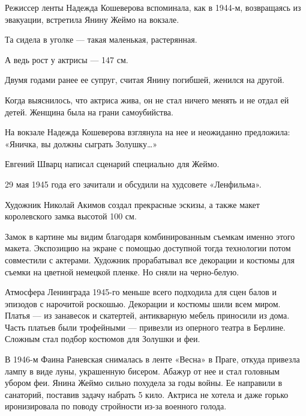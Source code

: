  
 
 


Режиссер ленты Надежда Кошеверова вспоминала, как в 1944-м, возвращаясь из эвакуации, встретила Янину Жеймо на вокзале.

Та сидела в уголке — такая маленькая, растерянная.

А ведь рост у актрисы — 147 см.

Двумя годами ранее ее супруг, считая Янину погибшей, женился на другой.

Когда выяснилось, что актриса жива, он не стал ничего менять и не отдал ей
детей.  Женщина была на грани самоубийства.

На вокзале Надежда Кошеверова взглянула на нее и неожиданно предложила:
«Яничка, вы должны сыграть Золушку…»

Евгений Шварц написал сценарий специально для Жеймо.

29 мая 1945 года его зачитали и обсудили на худсовете «Ленфильма».

Художник Николай Акимов создал прекрасные эскизы, а также макет королевского
замка высотой 100 см.

Замок в картине мы видим благодаря комбинированным съемкам именно этого макета.
Экспозицию на экране с помощью доступной тогда технологии потом совместили с
актерами. Художник прорабатывал все декорации и костюмы для съемки на цветной
немецкой пленке. Но сняли на черно-белую.

Атмосфера Ленинграда 1945-го меньше всего подходила для сцен балов и эпизодов с
нарочитой роскошью. Декорации и костюмы шили всем миром. Платья — из занавесок
и скатертей, антикварную мебель приносили из дома. Часть платьев были
трофейными — привезли из оперного театра в Берлине. Сложным стал подбор
костюмов для Золушки и феи.

В 1946-м Фаина Раневская снималась в ленте «Весна» в Праге, откуда привезла
лампу в виде луны, украшенную бисером. Абажур от нее и стал головным убором
феи.  Янина Жеймо сильно похудела за годы войны. Ее направили в санаторий,
поставив задачу набрать 5 кило. Актриса не хотела и даже горько иронизировала
по поводу стройности из-за военного голода.

